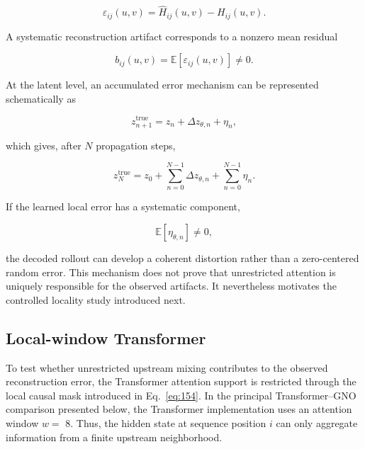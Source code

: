 \begin{equation}
\label{eq:176}
\varepsilon_{ij}(u,v)=\widehat H_{ij}(u,v)-H_{ij}(u,v).
\end{equation}

A systematic reconstruction artifact corresponds to a nonzero mean residual

\begin{equation}
\label{eq:177}
b_{ij}(u,v)=\mathbb E[\varepsilon_{ij}(u,v)]\ne0.
\end{equation}

At the latent level, an accumulated error mechanism can be represented schematically as

\begin{equation}
\label{eq:178}
z_{n+1}^{\mathrm{true}}=z_n+\Delta z_{\theta,n}+\eta_n,
\end{equation}

which gives, after \(N\) propagation steps,

\begin{equation}
\label{eq:179}
z_N^{\mathrm{true}}=z_0+\sum_{n=0}^{N-1}\Delta z_{\theta,n}+\sum_{n=0}^{N-1}\eta_n.
\end{equation}

If the learned local error has a systematic component,

\begin{equation}
\label{eq:180}
\mathbb E[\eta_{\theta,n}]\ne0,
\end{equation}

the decoded rollout can develop a coherent distortion rather than a zero-centered random error. This mechanism does not prove that unrestricted attention is uniquely responsible for the observed artifacts. It nevertheless motivates the controlled locality study introduced next.

\subsection{Local-window Transformer}
\label{sec:05_results_local_window_transformer}

To test whether unrestricted upstream mixing contributes to the observed reconstruction error, the Transformer attention support is restricted through the local causal mask introduced in Eq.~\eqref{eq:154}. In the principal Transformer–GNO comparison presented below, the Transformer implementation uses an attention window \(w =\) 8. Thus, the hidden state at sequence position \(i\) can only aggregate information from a finite upstream neighborhood.


